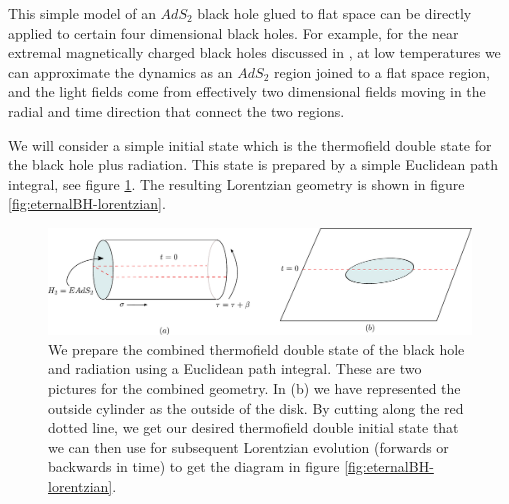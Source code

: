 This simple model of an $AdS_2$ black hole glued to flat space can be directly applied to certain four dimensional 
 black holes. For example, for the near extremal magnetically charged black holes discussed in \cite{Maldacena:2018gjk}, at low temperatures we can approximate the dynamics as an $AdS_2$ region joined to a flat space region, and the light fields come from effectively two dimensional fields moving in the radial and time direction that connect the two regions. 

We will consider a simple initial state which is the thermofield double state for the black hole plus radiation. 
This state is prepared by a simple Euclidean path integral, see figure \ref{fig:TFDpreparation}. The resulting
Lorentzian geometry is shown in figure \ref{fig:eternalBH-lorentzian}. 


\begin{figure}
\begin{center}
\includegraphics[scale=0.6]{figures/thermal-state.pdf}
\end{center}
\caption{We prepare the combined thermofield double state of the black hole and radiation using a Euclidean path integral. These are two pictures for the combined geometry. In   (b) we have represented the outside cylinder as the outside of the disk. By cutting along the red dotted line, we get our desired thermofield double initial state that we can then use for subsequent Lorentzian evolution (forwards or backwards in time) to get 
the diagram in figure \ref{fig:eternalBH-lorentzian}.  } 
\label{fig:TFDpreparation}
\end{figure}



